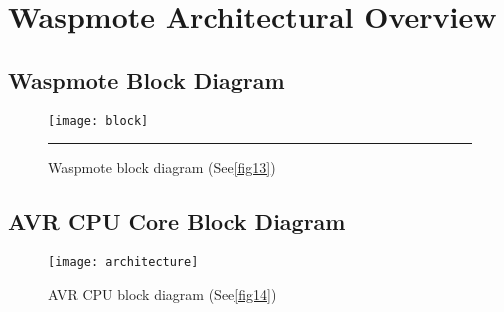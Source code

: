 \clearpage
\section{Waspmote Architectural Overview}
\label{AppendixB} %
\subsection{Waspmote Block Diagram}
\begin{figure}[ht]
\centering
\texttt{[image: block]}
\rule{30em}{0.5pt}
\caption{Waspmote block diagram (See\ref{fig13})}
\label{fig:block}
\end{figure}
\vspace{5cm}
\pagebreak
\subsection{AVR CPU Core Block Diagram}
\vspace{5cm}
\begin{figure}[ht]
\centering
\texttt{[image: architecture]}
\caption{AVR CPU block diagram (See\ref{fig14})}
\label{fig:architecture}
\end{figure}
